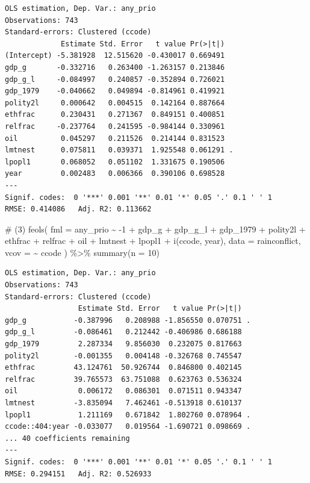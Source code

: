 \documentclass[
  a4paper,
  DIV=11,
  oneside]{scrreprt}
\newenvironment{Shaded}{\begin{snugshade}}{\end{snugshade}}
\newcommand{\AttributeTok}[1]{\textcolor[rgb]{0.40,0.45,0.13}{#1}}
\newcommand{\CommentTok}[1]{\textcolor[rgb]{0.37,0.37,0.37}{#1}}
\newcommand{\DecValTok}[1]{\textcolor[rgb]{0.68,0.00,0.00}{#1}}
\newcommand{\FunctionTok}[1]{\textcolor[rgb]{0.28,0.35,0.67}{#1}}
\newcommand{\NormalTok}[1]{\textcolor[rgb]{0.00,0.23,0.31}{#1}}
\newcommand{\SpecialCharTok}[1]{\textcolor[rgb]{0.37,0.37,0.37}{#1}}
\begin{document}
\begin{verbatim}
OLS estimation, Dep. Var.: any_prio
Observations: 743
Standard-errors: Clustered (ccode) 
             Estimate Std. Error   t value Pr(>|t|)    
(Intercept) -5.381928  12.515620 -0.430017 0.669491    
gdp_g       -0.332716   0.263400 -1.263157 0.213846    
gdp_g_l     -0.084997   0.240857 -0.352894 0.726021    
gdp_1979    -0.040662   0.049894 -0.814961 0.419921    
polity2l     0.000642   0.004515  0.142164 0.887664    
ethfrac      0.230431   0.271367  0.849151 0.400851    
relfrac     -0.237764   0.241595 -0.984144 0.330961    
oil          0.045297   0.211526  0.214144 0.831523    
lmtnest      0.075811   0.039371  1.925548 0.061291 .  
lpopl1       0.068052   0.051102  1.331675 0.190506    
year         0.002483   0.006366  0.390106 0.698528    
---
Signif. codes:  0 '***' 0.001 '**' 0.01 '*' 0.05 '.' 0.1 ' ' 1
RMSE: 0.414086   Adj. R2: 0.113662
\end{verbatim}

\begin{Shaded}
\begin{Highlighting}[]
\CommentTok{\# (3)}
\FunctionTok{feols}\NormalTok{(}
  \AttributeTok{fml =}\NormalTok{ any\_prio }\SpecialCharTok{\textasciitilde{}} \SpecialCharTok{{-}}\DecValTok{1}
  \SpecialCharTok{+}\NormalTok{  gdp\_g }\SpecialCharTok{+} 
\NormalTok{    gdp\_g\_l}
  \SpecialCharTok{+}\NormalTok{ gdp\_1979}
  \SpecialCharTok{+}\NormalTok{ polity2l }
  \SpecialCharTok{+}\NormalTok{ ethfrac }
  \SpecialCharTok{+}\NormalTok{ relfrac }
  \SpecialCharTok{+}\NormalTok{ oil }
  \SpecialCharTok{+}\NormalTok{ lmtnest }
  \SpecialCharTok{+}\NormalTok{ lpopl1 }
  \SpecialCharTok{+} \FunctionTok{i}\NormalTok{(ccode, year),}
  \AttributeTok{data =}\NormalTok{ rainconflict,}
  \AttributeTok{vcov =} \SpecialCharTok{\textasciitilde{}}\NormalTok{ ccode}
\NormalTok{) }\SpecialCharTok{\%\textgreater{}\%} 
  \FunctionTok{summary}\NormalTok{(}\AttributeTok{n =} \DecValTok{10}\NormalTok{)}
\end{Highlighting}
\end{Shaded}

\begin{verbatim}
OLS estimation, Dep. Var.: any_prio
Observations: 743
Standard-errors: Clustered (ccode) 
                 Estimate Std. Error   t value Pr(>|t|)    
gdp_g           -0.387996   0.208988 -1.856550 0.070751 .  
gdp_g_l         -0.086461   0.212442 -0.406986 0.686188    
gdp_1979         2.287334   9.856030  0.232075 0.817663    
polity2l        -0.001355   0.004148 -0.326768 0.745547    
ethfrac         43.124761  50.926744  0.846800 0.402145    
relfrac         39.765573  63.751088  0.623763 0.536324    
oil              0.006172   0.086301  0.071511 0.943347    
lmtnest         -3.835094   7.462461 -0.513918 0.610137    
lpopl1           1.211169   0.671842  1.802760 0.078964 .  
ccode::404:year -0.033077   0.019564 -1.690721 0.098669 .  
... 40 coefficients remaining
---
Signif. codes:  0 '***' 0.001 '**' 0.01 '*' 0.05 '.' 0.1 ' ' 1
RMSE: 0.294151   Adj. R2: 0.526933
\end{verbatim}
\end{document}
